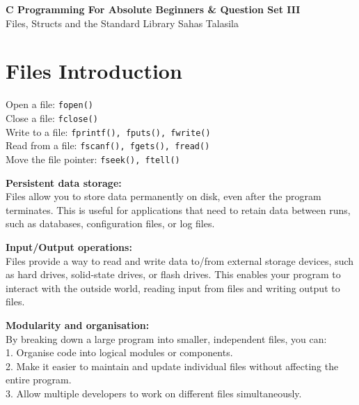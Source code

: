 \documentclass[a4paper,12pt]{article}
\begin{document}
\pagestyle{empty} 

\begin{titlepage}
    \centering
    \vspace*{2cm}
    \Huge{\textbf{C Programming For Absolute Beginners \& Question Set III}} \\[1.5cm]
    \Large{Files, Structs and the Standard Library}
    \Large{Sahas Talasila} \\[1cm]
    \vfill
\end{titlepage}

\tableofcontents
\newpage

\section{Files Introduction}

Open a file: \verb|fopen()|\\
Close a file: \verb|fclose()|\\
Write to a file: \verb|fprintf(), fputs(), fwrite()|\\
Read from a file: \verb|fscanf(), fgets(), fread()|\\
Move the file pointer: \verb|fseek(), ftell()|

\textbf{Persistent data storage:}\\
Files allow you to store data permanently on disk, even after the program terminates. This is useful for applications that need to retain data between runs, such as databases, configuration files, or log files.

\textbf{Input/Output operations:}\\
Files provide a way to read and write data to/from external storage devices, such as hard drives, solid-state drives, or flash drives. This enables your program to interact with the outside world, reading input from files and writing output to files.

\textbf{Modularity and organisation:}\\
By breaking down a large program into smaller, independent files, you can:\\
1. Organise code into logical modules or components.\\
2. Make it easier to maintain and update individual files without affecting the entire program.\\
3. Allow multiple developers to work on different files simultaneously.
\end{document}
